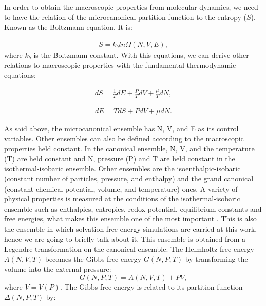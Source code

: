 In order to obtain the macroscopic properties from molecular dynamics, we need to have the relation of the microcanonical partition function to the entropy ($S$). Known as the Boltzmann equation. It is:

\begin{equation}
\begin{aligned}
S = k_{b} ln \Omega (N,V,E), 
\end{aligned}
\end{equation}
where $k_{b}$ is the Boltzmann constant. With this equations, we can derive other relations to macroscopic properties with the fundamental thermodynamic equations:

\begin{equation}
\begin{aligned}
dS = \frac{1}{T} dE + \frac{P}{T} dV + \frac{\mu}{T} dN,
\end{aligned}
\end{equation}

\begin{equation}
\begin{aligned}
dE = T dS + P dV + \mu dN .
\end{aligned}
\end{equation}

As said above, the microcanonical ensemble  has  N, V, and E as its control variables. Other ensembles can also be defined according to the macroscopic properties held constant.  In the canonical ensemble,  N, V, and the temperature (T) are held constant and  N, pressure (P) and T are held constant in the isothermal-isobaric ensemble. Other ensembles are the isoenthalpic-isobaric (constant number of particles, pressure, and enthalpy) and the grand canonical (constant chemical potential, volume, and temperature) ones. A variety of physical properties is measured at the conditions of the isothermal-isobaric ensemble such as enthalpies, entropies, redox potential, equilibrium constants and free energies, what makes this ensemble one of the most important \cite{tuckerman}. This is also the ensemble in which solvation free energy simulations are carried at this work, hence we are going to briefly talk about it. This ensemble is obtained from a Legendre transformation on the canonical ensemble. The Helmholtz free energy $A(N,V,T)$ becomes the Gibbs free energy $G(N,P,T)$ by transforming the volume into the external pressure:
\begin{equation}
G(N,P,T) = A(N,V,T) + PV,
\end{equation}
where $V = V(P)$. The Gibbs free energy is related to its partition function $\Delta (N,P,T)$ by:

